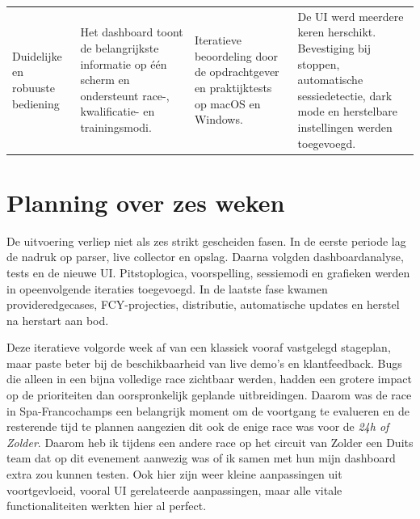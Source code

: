 \begin{longtable}{@{}
  >{\raggedright\arraybackslash}p{2.8cm}
  >{\raggedright\arraybackslash}p{3.5cm}
  >{\raggedright\arraybackslash}p{3.5cm}
  >{\raggedright\arraybackslash}p{3.2cm}
@{}}
\addlinespace
Duidelijke en robuuste bediening &
Het dashboard toont de belangrijkste informatie op één scherm en ondersteunt race-, kwalificatie- en trainingsmodi. &
Iteratieve beoordeling door de opdrachtgever en praktijktests op macOS en Windows. &
De UI werd meerdere keren herschikt. Bevestiging bij stoppen, automatische sessiedetectie, dark mode en herstelbare instellingen werden toegevoegd. \\

\end{longtable}
\normalsize

\section{Planning over zes weken}
De uitvoering verliep niet als zes strikt gescheiden fasen. In de eerste periode lag de nadruk op
parser, live collector en opslag. Daarna volgden dashboardanalyse, tests en de nieuwe UI.
Pitstoplogica, voorspelling, sessiemodi en grafieken werden in opeenvolgende iteraties toegevoegd.
In de laatste fase kwamen provideredgecases, FCY-projecties, distributie, automatische updates en
herstel na herstart aan bod.

Deze iteratieve volgorde week af van een klassiek vooraf vastgelegd stageplan, maar paste beter bij
de beschikbaarheid van live demo's en klantfeedback. Bugs die alleen in een bijna volledige race
zichtbaar werden, hadden een grotere impact op de prioriteiten dan oorspronkelijk geplande
uitbreidingen. Daarom was de race in Spa-Francochamps een belangrijk moment om de voortgang te evalueren en de resterende tijd te plannen aangezien dit ook de enige race was voor de \emph{24h of Zolder}. Daarom heb ik tijdens een andere race op het circuit van Zolder een Duits team dat op dit evenement aanwezig was of ik samen met hun mijn dashboard extra zou kunnen testen. Ook hier zijn weer kleine aanpassingen uit voortgevloeid, vooral UI gerelateerde aanpassingen, maar alle vitale functionaliteiten werkten hier al perfect.
\fi